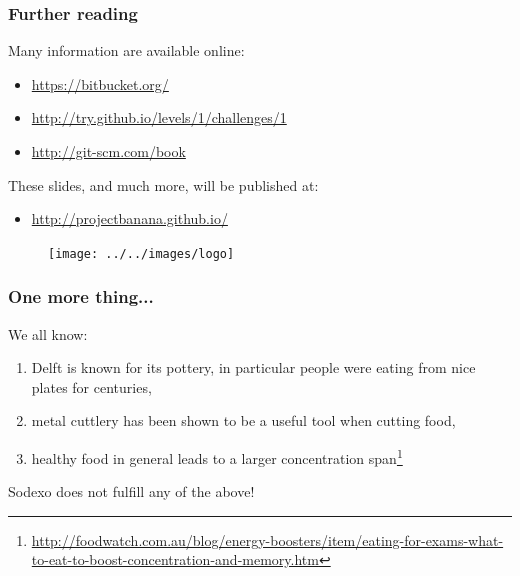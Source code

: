 \documentclass{beamer}
\begin{document}
\begin{frame}
\frametitle{Further reading}
Many information are available online:
\begin{itemize}
 \item \url{https://bitbucket.org/}
 \item \url{http://try.github.io/levels/1/challenges/1}
 \item \url{http://git-scm.com/book}
\end{itemize}
These slides, and much more, will be published at:
\begin{itemize}
 \item \url{http://projectbanana.github.io/}
\end{itemize}
 \begin{figure}
\centering
 \texttt{[image: ../../images/logo]}
\end{figure}
\end{frame}

\begin{frame}
\frametitle{One more thing...}
We all know:
\begin{enumerate}
 \item Delft is known for its pottery, in particular people were eating from nice plates for centuries,
 \pause
 \item metal cuttlery has been shown to be a useful tool when cutting food,
 \pause
 \item healthy food in general leads to a larger concentration span\footnote{\url{http://foodwatch.com.au/blog/energy-boosters/item/eating-for-exams-what-to-eat-to-boost-concentration-and-memory.htm}}
\end{enumerate}
\pause
{\color{red} \begin{center}Sodexo does not fulfill any of the above!\end{center}}
\end{frame}
\end{document}
